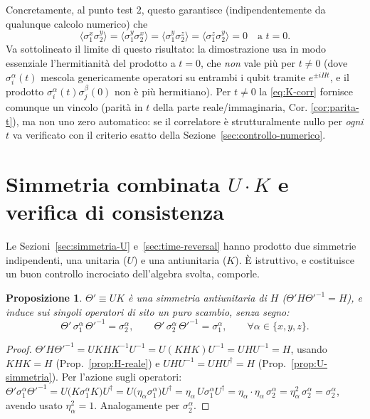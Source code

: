 \documentclass[11pt,a4paper]{article}
\newtheorem{proposizione}{Proposizione}
\begin{document}
\noindent
Concretamente, al punto test 2, questo garantisce (indipendentemente da qualunque calcolo
numerico) che
\begin{equation}
\langle\sigma_1^x\sigma_2^y\rangle = \langle\sigma_1^y\sigma_2^x\rangle
= \langle\sigma_1^y\sigma_2^z\rangle = \langle\sigma_1^z\sigma_2^y\rangle = 0 \quad\text{a } t=0.
\end{equation}
Va sottolineato il limite di questo risultato: la dimostrazione usa in modo essenziale
l'hermitianità del prodotto a $t=0$, che \emph{non} vale più per $t\neq0$ (dove
$\sigma_i^\alpha(t)$ mescola generi\-camente operatori su entrambi i qubit tramite $e^{\pm iHt}$,
e il prodotto $\sigma_i^\alpha(t)\sigma_j^\beta(0)$ non è più hermitiano). Per $t\neq0$ la
\eqref{eq:K-corr} fornisce comunque un vincolo (parità in $t$ della parte reale/immaginaria, Cor.
\ref{cor:parita-t}), ma non uno zero automatico: se il correlatore è strutturalmente nullo per
\emph{ogni} $t$ va verificato con il criterio esatto della Sezione~\ref{sec:controllo-numerico}.

\section{Simmetria combinata $U\!\cdot\!K$ e verifica di consistenza}

Le Sezioni~\ref{sec:simmetria-U} e~\ref{sec:time-reversal} hanno prodotto due simmetrie
indipendenti, una unitaria ($U$) e una antiunitaria ($K$). È istruttivo, e costituisce un buon
controllo incrociato dell'algebra svolta, comporle.

\begin{proposizione}
$\Theta'\equiv UK$ è una simmetria antiunitaria di $H$ ($\Theta' H\Theta'^{-1}=H$), e induce sui
singoli operatori di sito un puro scambio, \emph{senza} segno:
\begin{equation}
\Theta'\,\sigma_1^\alpha\,\Theta'^{-1} = \sigma_2^\alpha, \qquad
\Theta'\,\sigma_2^\alpha\,\Theta'^{-1} = \sigma_1^\alpha,
\qquad \forall\alpha\in\{x,y,z\}.
\end{equation}
\end{proposizione}

\begin{proof}
$\Theta'H\Theta'^{-1} = UKHK^{-1}U^{-1} = U(KHK)U^{-1} = UHU^{-1}=H$, usando $KHK=H$
(Prop.~\ref{prop:H-reale}) e $UHU^{-1}=UHU^\dagger=H$ (Prop.~\ref{prop:U-simmetria}). Per
l'azione sugli operatori: $\Theta'\sigma_1^\alpha\Theta'^{-1} = U\big(K\sigma_1^\alpha K\big)U^\dagger
= U\big(\eta_\alpha\sigma_1^\alpha\big)U^\dagger = \eta_\alpha\,U\sigma_1^\alpha U^\dagger
= \eta_\alpha\cdot\eta_\alpha\,\sigma_2^\alpha = \eta_\alpha^2\,\sigma_2^\alpha = \sigma_2^\alpha$,
avendo usato $\eta_\alpha^2=1$. Analogamente per $\sigma_2^\alpha$.
\end{proof}
\end{document}

